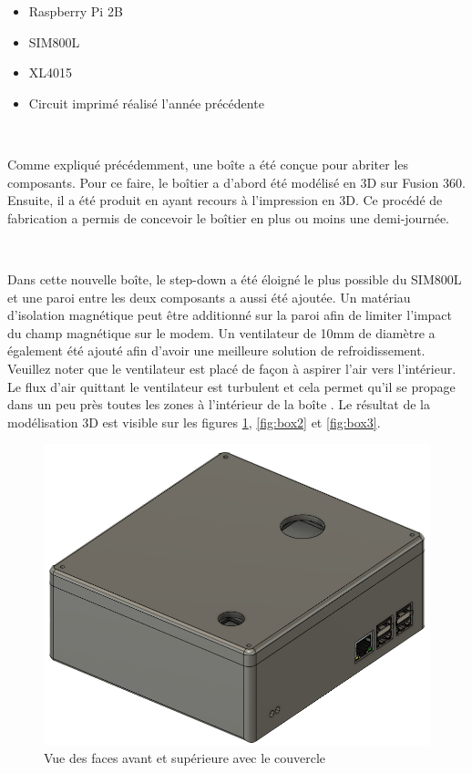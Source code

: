 \begin{itemize}
  \item Raspberry Pi 2B
  \item SIM800L
  \item XL4015
  \item Circuit imprimé réalisé l'année précédente
\end{itemize}

~

\noindent
 Comme expliqué précédemment, une boîte a été conçue pour abriter les composants. Pour ce faire, le boîtier a d'abord été modélisé en 3D sur Fusion 360. Ensuite, il a été produit en ayant recours à l'impression en 3D. Ce procédé de fabrication a permis de concevoir le boîtier en plus ou moins une demi-journée.

 ~

 \noindent
Dans cette nouvelle boîte, le step-down a été éloigné le plus possible du SIM800L et une paroi entre les deux composants a aussi été ajoutée. Un matériau d'isolation magnétique peut être additionné sur la paroi afin de limiter l'impact du champ magnétique sur le modem. Un ventilateur de 10mm de diamètre a également été ajouté afin d'avoir une meilleure solution de refroidissement. Veuillez noter que le ventilateur est placé de façon à aspirer l'air vers l'intérieur. Le flux d'air quittant le ventilateur est turbulent et cela permet qu'il se propage dans un peu près toutes les zones à l'intérieur de la boîte \cite{cooling}. Le résultat de la modélisation 3D est visible sur les figures \ref{fig:box1}, \ref{fig:box2} et \ref{fig:box3}.



\begin{figure}[ht!]
  \centering
  \includegraphics[scale=0.4]{img/el_prototype/box1}
  \caption{Vue des faces avant et supérieure avec le couvercle}
  \label{fig:box1}
\end{figure}


